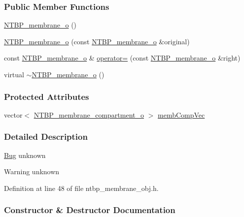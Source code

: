 \subsubsection*{Public Member Functions}
\begin{DoxyCompactItemize}
\item 
\hyperlink{class_n_t_b_p__membrane__o_af08093269d86a2381fee5617fba7af9e}{NTBP\_\-membrane\_\-o} ()
\item 
\hyperlink{class_n_t_b_p__membrane__o_a584a50f50d65b1180d7698508721d94f}{NTBP\_\-membrane\_\-o} (const \hyperlink{class_n_t_b_p__membrane__o}{NTBP\_\-membrane\_\-o} \&original)
\item 
const \hyperlink{class_n_t_b_p__membrane__o}{NTBP\_\-membrane\_\-o} \& \hyperlink{class_n_t_b_p__membrane__o_a9a45d38ba07b01d2b703d001b812828f}{operator=} (const \hyperlink{class_n_t_b_p__membrane__o}{NTBP\_\-membrane\_\-o} \&right)
\item 
virtual \hyperlink{class_n_t_b_p__membrane__o_abd0333fee5d63358e253208ac6e8a0c2}{$\sim$NTBP\_\-membrane\_\-o} ()
\end{DoxyCompactItemize}
\subsubsection*{Protected Attributes}
\begin{DoxyCompactItemize}
\item 
vector$<$ \hyperlink{class_n_t_b_p__membrane__compartment__o}{NTBP\_\-membrane\_\-compartment\_\-o} $>$ \hyperlink{class_n_t_b_p__membrane__o_a845f627e7cfd6ba8d117121665c67314}{membCompVec}
\end{DoxyCompactItemize}


\subsubsection{Detailed Description}
\begin{Desc}
\item[\hyperlink{bug__bug000067}{Bug}]unknown \end{Desc}
\begin{DoxyWarning}{Warning}
unknown 
\end{DoxyWarning}


Definition at line 48 of file ntbp\_\-membrane\_\-obj.h.



\subsubsection{Constructor \& Destructor Documentation}

